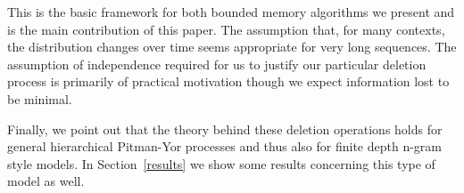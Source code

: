 This is the basic framework for both bounded memory algorithms we present and is the main contribution of this paper.  The assumption that, for many contexts, the distribution changes over time seems appropriate for very long sequences. The assumption of independence required for us to justify our particular deletion process is primarily of practical motivation though we expect information lost to be minimal. 

Finally, we point out that the theory behind these deletion operations holds for general hierarchical Pitman-Yor processes and thus also for finite depth n-gram style models.  In Section~\ref{results} we show some results concerning this type of model as well.
